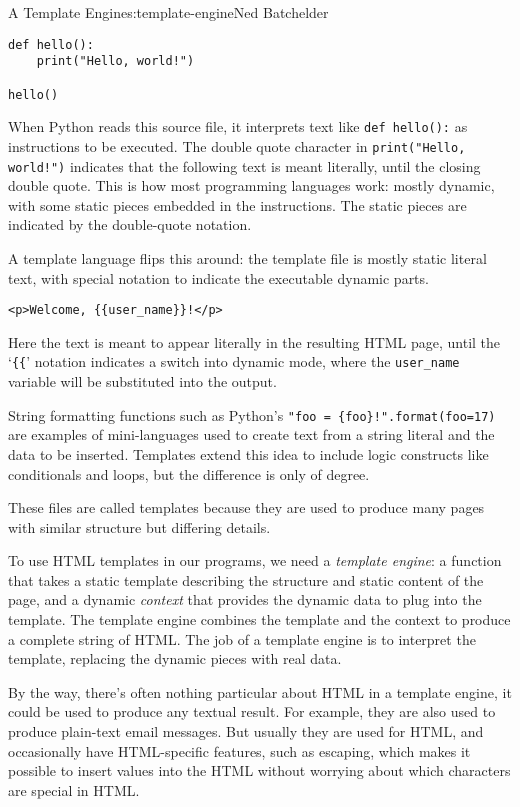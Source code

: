 \begin{aosachapter}{A Template Engine}{s:template-engine}{Ned Batchelder}
\begin{verbatim}
def hello():
    print("Hello, world!")

hello()
\end{verbatim}

When Python reads this source file, it interprets text like
\texttt{def hello():} as instructions to be executed. The double quote
character in \texttt{print("Hello, world!")} indicates that the
following text is meant literally, until the closing double quote. This
is how most programming languages work: mostly dynamic, with some static
pieces embedded in the instructions. The static pieces are indicated by
the double-quote notation.

A template language flips this around: the template file is mostly
static literal text, with special notation to indicate the executable
dynamic parts.

\begin{verbatim}
<p>Welcome, {{user_name}}!</p>
\end{verbatim}

Here the text is meant to appear literally in the resulting HTML page,
until the `\texttt{\{\{}' notation indicates a switch into dynamic mode,
where the \texttt{user\_name} variable will be substituted into the
output.

String formatting functions such as Python's
\texttt{"foo = \{foo\}!".format(foo=17)} are examples of mini-languages
used to create text from a string literal and the data to be inserted.
Templates extend this idea to include logic constructs like conditionals
and loops, but the difference is only of degree.

These files are called templates because they are used to produce many
pages with similar structure but differing details.

To use HTML templates in our programs, we need a \emph{template engine}:
a function that takes a static template describing the structure and
static content of the page, and a dynamic \emph{context} that provides
the dynamic data to plug into the template. The template engine combines
the template and the context to produce a complete string of HTML. The
job of a template engine is to interpret the template, replacing the
dynamic pieces with real data.

By the way, there's often nothing particular about HTML in a template
engine, it could be used to produce any textual result. For example,
they are also used to produce plain-text email messages. But usually
they are used for HTML, and occasionally have HTML-specific features,
such as escaping, which makes it possible to insert values into the HTML
without worrying about which characters are special in HTML.


\end{aosachapter}
